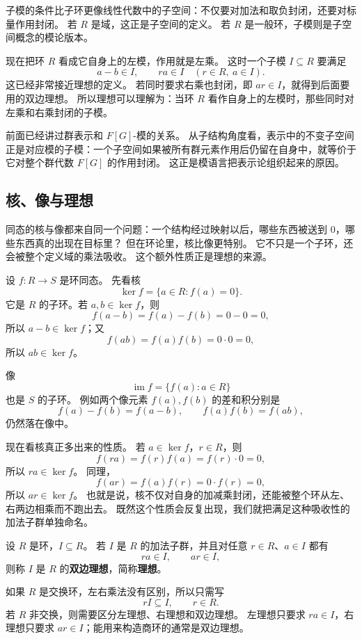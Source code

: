 子模的条件比子环更像线性代数中的子空间：不仅要对加法和取负封闭，还要对标量作用封闭。
若 $R$ 是域，这正是子空间的定义。
若 $R$ 是一般环，子模则是子空间概念的模论版本。

现在把环 $R$ 看成它自身上的左模，作用就是左乘。
这时一个子模 $I\subseteq R$ 要满足
\[
a-b\in I,\qquad r a\in I\quad(r\in R,\ a\in I).
\]
这已经非常接近理想的定义。
若同时要求右乘也封闭，即 $ar\in I$，就得到后面要用的双边理想。
所以理想可以理解为：当环 $R$ 看作自身上的左模时，那些同时对左乘和右乘封闭的子模。

前面已经讲过群表示和 $F[G]$-模的关系。
从子结构角度看，表示中的不变子空间正是对应模的子模：一个子空间如果被所有群元素作用后仍留在自身中，就等价于它对整个群代数 $F[G]$ 的作用封闭。
这正是模语言把表示论组织起来的原因。

\subsection{核、像与理想}\label{sec:kernels-images-ideals}

同态的核与像都来自同一个问题：一个结构经过映射以后，哪些东西被送到 $0$，哪些东西真的出现在目标里？
但在环论里，核比像更特别。
它不只是一个子环，还会被整个定义域的乘法吸收。
这个额外性质正是理想的来源。

设 $f:R\to S$ 是环同态。
先看核
\[
\ker f=\{a\in R:f(a)=0\}.
\]
它是 $R$ 的子环。若 $a,b\in\ker f$，则
\[
f(a-b)=f(a)-f(b)=0-0=0,
\]
所以 $a-b\in\ker f$；又
\[
f(ab)=f(a)f(b)=0\cdot0=0,
\]
所以 $ab\in\ker f$。

像
\[
\operatorname{im}f=\{f(a):a\in R\}
\]
也是 $S$ 的子环。
例如两个像元素 $f(a),f(b)$ 的差和积分别是
\[
f(a)-f(b)=f(a-b),\qquad f(a)f(b)=f(ab),
\]
仍然落在像中。

现在看核真正多出来的性质。
若 $a\in\ker f$，$r\in R$，则
\[
f(ra)=f(r)f(a)=f(r)\cdot0=0,
\]
所以 $ra\in\ker f$。
同理，
\[
f(ar)=f(a)f(r)=0\cdot f(r)=0,
\]
所以 $ar\in\ker f$。
也就是说，核不仅对自身的加减乘封闭，还能被整个环从左、右两边相乘而不跑出去。
既然这个性质会反复出现，我们就把满足这种吸收性的加法子群单独命名。

\begin{definition}[理想]\label{def:ideal}
设 $R$ 是环，$I\subseteq R$。
若 $I$ 是 $R$ 的加法子群，并且对任意 $r\in R$、$a\in I$ 都有
\[
ra\in I,\qquad ar\in I,
\]
则称 $I$ 是 $R$ 的\textbf{双边理想}，简称\textbf{理想}。
\end{definition}

如果 $R$ 是交换环，左右乘法没有区别，所以只需写
\[
rI\subseteq I,\qquad r\in R.
\]
若 $R$ 非交换，则需要区分左理想、右理想和双边理想。
左理想只要求 $ra\in I$，右理想只要求 $ar\in I$；能用来构造商环的通常是双边理想。

